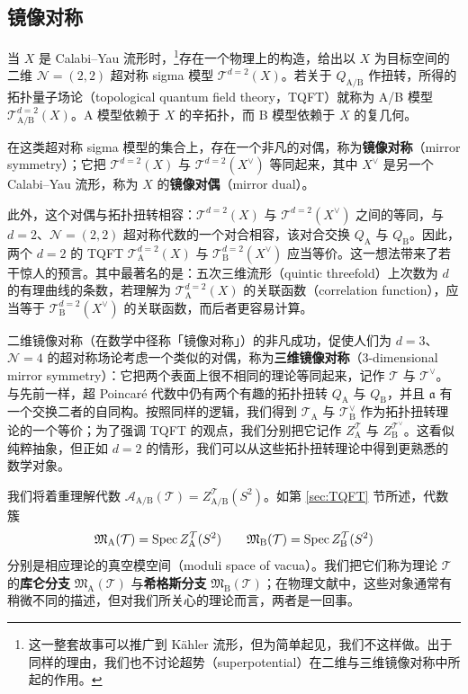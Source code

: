 \subsection{镜像对称}

当 $X$ 是 Calabi--Yau 流形时，\footnote{这一整套故事可以推广到 K\"ahler 流形，但为简单起见，我们不这样做。出于同样的理由，我们也不讨论超势（superpotential）在二维与三维镜像对称中所起的作用。}存在一个物理上的构造，给出以 $X$ 为目标空间的二维 $\mathcal N=(2,2)$ 超对称 sigma 模型 $\mathcal{T}^{d=2}(X)$。若关于 $Q_{\operatorname{A/B}}$ 作扭转，所得的拓扑量子场论（topological quantum field theory，TQFT）就称为 A/B 模型 $\mathcal{T}^{d=2}_{\operatorname{A/B}}(X)$。A 模型依赖于 $X$ 的辛拓扑，而 B 模型依赖于 $X$ 的复几何。

在这类超对称 sigma 模型的集合上，存在一个非凡的对偶，称为\textbf{镜像对称}（mirror symmetry）；它把 $\mathcal{T}^{d=2}(X)$ 与 $\mathcal{T}^{d=2}(X^\vee)$ 等同起来，其中 $X^\vee$ 是另一个 Calabi--Yau 流形，称为 $X$ 的\textbf{镜像对偶}（mirror dual）。

此外，这个对偶与拓扑扭转相容：$\mathcal{T}^{d=2}(X)$ 与 $\mathcal{T}^{d=2}(X^\vee)$ 之间的等同，与 $d=2$、$\mathcal N=(2,2)$ 超对称代数的一个对合相容，该对合交换 $Q_{\operatorname{A}}$ 与 $Q_{\operatorname{B}}$。因此，两个 $d=2$ 的 TQFT $\mathcal{T}^{d=2}_{\operatorname{A}}(X)$ 与 $\mathcal{T}^{d=2}_{\operatorname{B}}(X^\vee)$ 应当等价。这一想法带来了若干惊人的预言。其中最著名的是：五次三维流形（quintic threefold）上次数为 $d$ 的有理曲线的条数，若理解为 $\mathcal{T}^{d=2}_{\operatorname{A}}(X)$ 的关联函数（correlation function），应当等于 $\mathcal{T}^{d=2}_{\operatorname{B}}(X^\vee)$ 的关联函数，而后者更容易计算。

二维镜像对称（在数学中径称「镜像对称」）的非凡成功，促使人们为 $d=3$、$\mathcal N=4$ 的超对称场论考虑一个类似的对偶，称为\textbf{三维镜像对称}（3-dimensional mirror symmetry）：它把两个表面上很不相同的理论等同起来，记作 $\mathcal{T}$ 与 $\mathcal{T}^\vee$。与先前一样，超 Poincar\'e 代数中仍有两个有趣的拓扑扭转 $Q_{\operatorname{A}}$ 与 $Q_{\operatorname{B}}$，并且 $\mathfrak{a}$ 有一个交换二者的自同构。按照同样的逻辑，我们得到 $\mathcal{T}_{\operatorname{A}}$ 与 $\mathcal{T}_{\operatorname{B}}^{\vee}$ 作为拓扑扭转理论的一个等价；为了强调 TQFT 的观点，我们分别把它记作 $Z_{\operatorname{A}}^{\mathcal{T}}$ 与 $Z_{\operatorname{B}}^{\mathcal{T}^\vee}$。这看似纯粹抽象，但正如 $d=2$ 的情形，我们可以从这些拓扑扭转理论中得到更熟悉的数学对象。

我们将着重理解代数 $\mathcal{A}_{\operatorname{A/B}}(\mathcal{T})=Z_{\operatorname{A/B}}^{\mathcal{T}}(S^2)$。如第 \ref{sec:TQFT} 节所述，代数簇
\[\mathfrak{M}_{\operatorname{A}}(\mathcal{T})=\operatorname{Spec} Z_{\operatorname{A}}^{\mathcal{T}}(S^{2})\qquad \mathfrak{M}_{\operatorname{B}}(\mathcal{T})=\operatorname{Spec} Z_{\operatorname{B}}^{\mathcal{T}}(S^{2})\]
分别是相应理论的真空模空间（moduli space of vacua）。我们把它们称为理论 $\mathcal{T}$ 的\textbf{库仑分支} $\mathfrak{M}_{\operatorname{A}}(\mathcal{T})$ 与\textbf{希格斯分支} $\mathfrak{M}_{\operatorname{B}}(\mathcal{T})$；在物理文献中，这些对象通常有稍微不同的描述，但对我们所关心的理论而言，两者是一回事。

